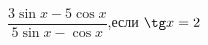 \begin{ex}[type=calculate_expression]
	\begin{condition}
		\( \dfrac{3\sin x - 5\cos x}{5\sin x - \cos x} \),\quad если \( \tg x = 2 \)
	\end{condition}
\end{ex}